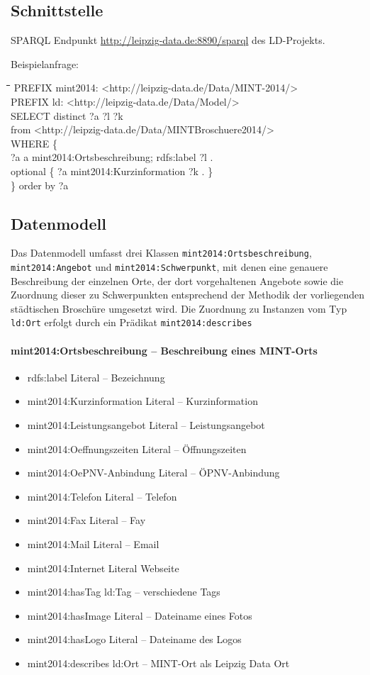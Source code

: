 \documentclass[a4paper,11pt]{article}
\newenvironment{code}{\tt \begin{tabbing}
\hskip12pt\=\hskip12pt\=\hskip12pt\=\hskip12pt\=\hskip5cm\=\hskip5cm\=\kill}
{\end{tabbing}}
\begin{document}
\subsection{Schnittstelle}

SPARQL Endpunkt \url{http://leipzig-data.de:8890/sparql} des LD-Projekts.

Beispielanfrage:
\begin{code}  
  PREFIX mint2014: <http://leipzig-data.de/Data/MINT-2014/> \\
  PREFIX ld: <http://leipzig-data.de/Data/Model/> \\
  SELECT distinct ?a ?l ?k \\
  from  <http://leipzig-data.de/Data/MINTBroschuere2014/> \\
  WHERE \{ \+\\
    ?a a mint2014:Ortsbeschreibung; rdfs:label ?l . \\ 
    optional \{ ?a mint2014:Kurzinformation ?k . \} \-\\ 
  \} order by ?a
\end{code}

\subsection{Datenmodell}

Das Datenmodell umfasst drei Klassen \texttt{mint2014:Ortsbeschreibung},
\texttt{mint2014:Angebot} und \texttt{mint2014:Schwerpunkt}, mit denen eine
genauere Beschreibung der einzelnen Orte, der dort vorgehaltenen Angebote sowie
die Zuordnung dieser zu Schwerpunkten entsprechend der Methodik der
vorliegenden städtischen Broschüre umgesetzt wird.  Die Zuordnung zu Instanzen
vom Typ \texttt{ld:Ort} erfolgt durch ein Prädikat \texttt{mint2014:describes}

\paragraph{mint2014:Ortsbeschreibung – Beschreibung eines MINT-Orts}
\begin{itemize}
\item rdfs:label Literal – Bezeichnung
\item  mint2014:Kurzinformation Literal – Kurzinformation
\item  mint2014:Leistungsangebot Literal – Leistungsangebot
\item  mint2014:Oeffnungszeiten Literal – Öffnungszeiten
\item  mint2014:OePNV-Anbindung Literal – ÖPNV-Anbindung
\item  mint2014:Telefon Literal – Telefon
\item  mint2014:Fax Literal – Fay
\item  mint2014:Mail Literal – Email
\item  mint2014:Internet Literal  Webseite
\item  mint2014:hasTag ld:Tag – verschiedene Tags
\item  mint2014:hasImage Literal – Dateiname eines Fotos
\item  mint2014:hasLogo Literal – Dateiname des Logos
\item  mint2014:describes ld:Ort – MINT-Ort als Leipzig Data Ort
\end{itemize}
\end{document}
